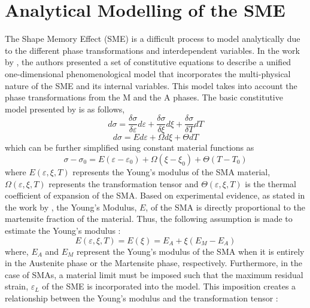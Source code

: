 \section{Analytical Modelling of the SME}

The Shape Memory Effect (SME) is a difficult process to model analytically due to the different phase transformations and interdependent variables. In the work by \cite{liangConstitutiveModelingShape1990a}, the authors presented a set of constitutive equations to describe a unified one-dimensional phenomenological model that incorporates the multi-physical nature of the SME and its internal variables. This model takes into account the phase transformations from the M and the A phases. The basic constitutive model presented by \cite{liangConstitutiveModelingShape1990a} is as follows,
\begin{equation}
  \label{eq:liang_model_1}
  d\sigma = \frac{\delta\sigma}{\delta\varepsilon}d\varepsilon + \frac{\delta\sigma}{\delta\xi}d\xi + \frac{\delta\sigma}{\delta T}dT
\end{equation}
\begin{equation}
  \label{eq:liang_model_2}
  d\sigma = Ed\varepsilon + \Omega d\xi + \Theta dT
\end{equation}
 which can be further simplified using constant material functions as
\begin{equation}
  \label{eq:liang_model_3}
  \sigma-\sigma_0 = E(\varepsilon-\varepsilon_0) + \Omega(\xi-\xi_0) + \Theta(T-T_0)
\end{equation}
where $E(\varepsilon,\xi,T)$ represents the Young's modulus of the SMA material, $\Omega(\varepsilon,\xi,T)$ represents the transformation tensor and $\Theta(\varepsilon,\xi,T)$ is the thermal coefficient of expansion of the SMA. Based on experimental evidence, as stated in the work by \cite{liangConstitutiveModelingShape1990a}, the Young's Modulus, $E$, of the SMA is directly proportional to the martensite fraction of the material. Thus, the following assumption is made to estimate the Young's modulus :
\begin{equation}
  \label{eq:youngs-modulus}
  E(\varepsilon,\xi,T) = E(\xi) = E_A + \xi(E_M-E_A)
\end{equation}
where, $E_A$ and $E_M$ represent the Young's modulus of the SMA when it is entirely in the Austenite phase or the Martensite phase, respectively. Furthermore, in the case of SMAs, a material limit must be imposed such that the maximum residual strain, $\varepsilon_L$ of the SME is incorporated into the model. This imposition creates a relationship between the Young's modulus and the transformation tensor :
